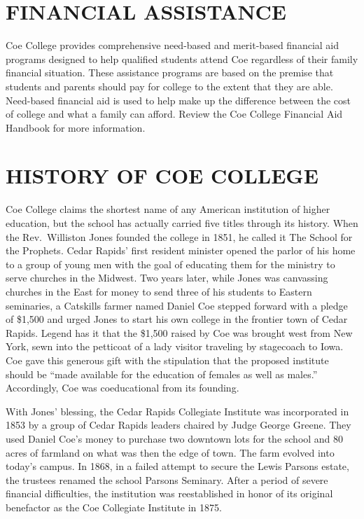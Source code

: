 \documentclass[
  letterpaper,
]{scrbook}
\begin{document}
\section{FINANCIAL ASSISTANCE}\label{financial-assistance}

Coe College provides comprehensive need-based and merit-based financial
aid programs designed to help qualified students attend Coe regardless
of their family financial situation. These assistance programs are based
on the premise that students and parents should pay for college to the
extent that they are able. Need-based financial aid is used to help make
up the difference between the cost of college and what a family can
afford. Review the Coe College Financial Aid Handbook for more
information.

\section{HISTORY OF COE COLLEGE}\label{sec-history-of-coe-college}

Coe College claims the shortest name of any American institution of
higher education, but the school has actually carried five titles
through its history. When the Rev.~Williston Jones founded the college
in 1851, he called it The School for the Prophets. Cedar Rapids' first
resident minister opened the parlor of his home to a group of young men
with the goal of educating them for the ministry to serve churches in
the Midwest. Two years later, while Jones was canvassing churches in the
East for money to send three of his students to Eastern seminaries, a
Catskills farmer named Daniel Coe stepped forward with a pledge of
\$1,500 and urged Jones to start his own college in the frontier town of
Cedar Rapids. Legend has it that the \$1,500 raised by Coe was brought
west from New York, sewn into the petticoat of a lady visitor traveling
by stagecoach to Iowa. Coe gave this generous gift with the stipulation
that the proposed institute should be ``made available for the education
of females as well as males.'' Accordingly, Coe was coeducational from
its founding.

With Jones' blessing, the Cedar Rapids Collegiate Institute was
incorporated in 1853 by a group of Cedar Rapids leaders chaired by Judge
George Greene. They used Daniel Coe's money to purchase two downtown
lots for the school and 80 acres of farmland on what was then the edge
of town. The farm evolved into today's campus. In 1868, in a failed
attempt to secure the Lewis Parsons estate, the trustees renamed the
school Parsons Seminary. After a period of severe financial
difficulties, the institution was reestablished in honor of its original
benefactor as the Coe Collegiate Institute in 1875.
\end{document}
